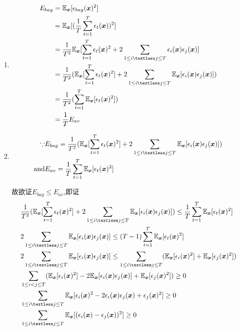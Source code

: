 \documentclass[answers]{exam}  %
\begin{document}
\begin{questions}
	\begin{solution}
		\begin{enumerate}
			\item \begin{align*}
				      E_{bag} & =\mathbb{E}_{\vx}[\epsilon_{bag}(\vx)^2]
				      \\&=\mathbb{E}_{\vx}[(\frac{1}{T}\sum_{t=1}^{T}\epsilon_t(\vx))^2]\\
				              & =\frac{1}{T^2}\mathbb{E}_{\vx}[\sum_{t=1}^{T}\epsilon_t(\vx)^2+2\sum_{1\leq i\textless j\leq T}\epsilon_i(\vx)\epsilon_j(\vx)]                     \\
				              & =\frac{1}{T^2}(\mathbb{E}_{\vx}[\sum_{t=1}^{T}\epsilon_t(\vx)^2]+2\sum_{1\leq i\textless j\leq T}\mathbb{E}_{\vx}[\epsilon_i(\vx)\epsilon_j(\vx)]) \\
				              & =\frac{1}{T^2}(\sum_{t=1}^T \mathbb{E}_{\vx}[\epsilon_t(\vx)^2])                                                                                   \\
				              & =\frac{1}{T}E_{av}
			      \end{align*}
			\item \begin{align*}
				      \because   & E_{bag}=\frac{1}{T^2}(\mathbb{E}_{\vx}[\sum_{t=1}^{T}\epsilon_t(\vx)^2]+2\sum_{1\leq i\textless j\leq T}\mathbb{E}_{\vx}[\epsilon_i(\vx)\epsilon_j(\vx)]) \\
				      \text{and} & E_{av}=\frac{1}{T}\sum_{t=1}^T \mathbb{E}_{\vx}[\epsilon_t(\vx)^2]
			      \end{align*}

			      故欲证$E_{bag}\leq E_{av}$,即证
			      \begin{align*}
				       & \frac{1}{T^2}(\mathbb{E}_{\vx}[\sum_{t=1}^{T}\epsilon_t(\vx)^2]+2\sum_{1\leq i\textless j\leq T}\mathbb{E}_{\vx}[\epsilon_i(\vx)\epsilon_j(\vx)])\leq\frac{1}{T}\sum_{t=1}^T \mathbb{E}_{\vx}[\epsilon_t(\vx)^2] \\
				       & 2\sum_{1\leq i\textless j\leq T}\mathbb{E}_{\vx}[\epsilon_i(\vx)\epsilon_j(\vx)]\leq (T-1)\sum_{t=1}^T \mathbb{E}_{\vx}[\epsilon_t(\vx)^2]                                                                       \\
				       & 2\sum_{1\leq i\textless j\leq T}\mathbb{E}_{\vx}[\epsilon_i(\vx)\epsilon_j(\vx)]\leq \sum_{1\leq i\textless j\leq T}(\mathbb{E}_{\vx}[\epsilon_i(\vx)^2]+\mathbb{E}_{\vx}[\epsilon_j(\vx)^2])                    \\
				       & \sum_{1\leq i< j\leq T}(\mathbb{E}_{\vx}[\epsilon_i(\vx)^2]-2\mathbb{E}_{\vx}[\epsilon_i(\vx)\epsilon_j(\vx)]+\mathbb{E}_{\vx}[\epsilon_j(\vx)^2])\geq0                                                          \\
				       & \sum_{1\leq i\textless j\leq T}\mathbb{E}_{\vx}[\epsilon_i(\vx)^2-2\epsilon_i(\vx)\epsilon_j(\vx)+\epsilon_j(\vx)^2]\geq0                                                                                        \\
				       & \sum_{1\leq i\textless j\leq T}\mathbb{E}_{\vx}[(\epsilon_i(\vx)-\epsilon_j(\vx))^2]\geq0
			      \end{align*}


\end{enumerate}
\end{solution}
\end{questions}
\end{document}
